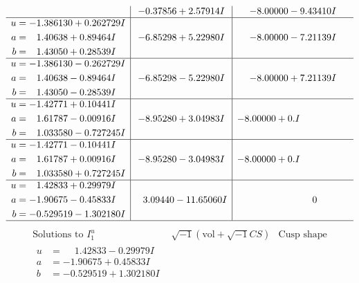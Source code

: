\documentclass[1p]{elsarticle_modified}
\theoremstyle{definition}
\newcommand{\I}{\sqrt{-1}}
\begin{document}
$$\begin{array}{c|c|c}
 & -0.37856 + 2.57914 I & -8.00000 - 9.43410 I \\ \hline\begin{aligned}
u &= -1.386130 + 0.262729 I \\
a &= \phantom{-}1.40638 + 0.89464 I \\
b &= \phantom{-}1.43050 + 0.28539 I\end{aligned}
 & -6.85298 + 5.22980 I & -8.00000 - 7.21139 I \\ \hline\begin{aligned}
u &= -1.386130 - 0.262729 I \\
a &= \phantom{-}1.40638 - 0.89464 I \\
b &= \phantom{-}1.43050 - 0.28539 I\end{aligned}
 & -6.85298 - 5.22980 I & -8.00000 + 7.21139 I \\ \hline\begin{aligned}
u &= -1.42771 + 0.10441 I \\
a &= \phantom{-}1.61787 - 0.00916 I \\
b &= \phantom{-}1.033580 - 0.727245 I\end{aligned}
 & -8.95280 + 3.04983 I & -8.00000 + 0. I\phantom{ +0.000000I} \\ \hline\begin{aligned}
u &= -1.42771 - 0.10441 I \\
a &= \phantom{-}1.61787 + 0.00916 I \\
b &= \phantom{-}1.033580 + 0.727245 I\end{aligned}
 & -8.95280 - 3.04983 I & -8.00000 + 0. I\phantom{ +0.000000I} \\ \hline\begin{aligned}
u &= \phantom{-}1.42833 + 0.29979 I \\
a &= -1.90675 - 0.45833 I \\
b &= -0.529519 - 1.302180 I\end{aligned}
 & \phantom{-}3.09440 - 11.65060 I & \phantom{-0.000000 } 0\\
 \hline 
 \end{array}$$\newpage$$\begin{array}{c|c|c}  
\text{Solutions to }I^u_{1}& \I (\text{vol} + \sqrt{-1}CS) & \text{Cusp shape}\\
 \hline 
\begin{aligned}
u &= \phantom{-}1.42833 - 0.29979 I \\
a &= -1.90675 + 0.45833 I \\
b &= -0.529519 + 1.302180 I\end{aligned}

\end{array}$$
\end{document}

